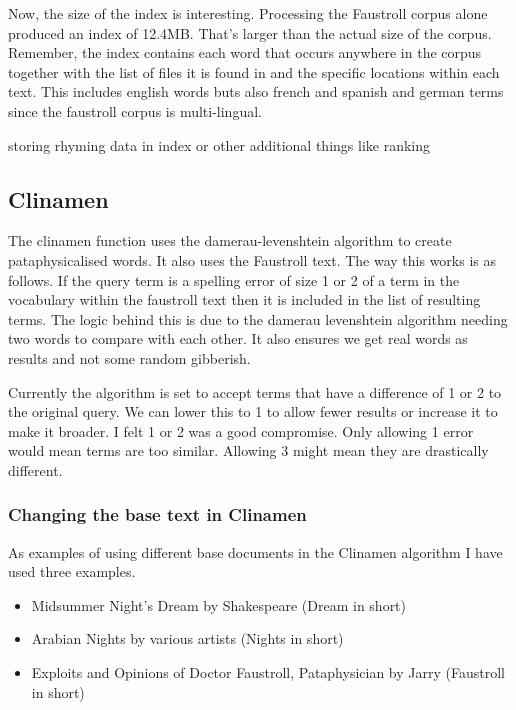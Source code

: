 {Now, the size of the index is interesting. Processing the Faustroll corpus alone produced an index of 12.4MB. That's larger than the actual size of the corpus. Remember, the index contains each word that occurs anywhere in the corpus together with the list of files it is found in and the specific locations within each text. This includes english words buts also french and spanish and german terms since the faustroll corpus is multi-lingual.


storing rhyming data in index or other additional things like ranking


\subsection{Clinamen}

The clinamen function uses the damerau-levenshtein algorithm to create pataphysicalised words. It also uses the Faustroll text. The way this works is as follows. If the query term is a spelling error of size 1 or 2 of a term in the vocabulary within the faustroll text then it is included in the list of resulting terms. The logic behind this is due to the damerau levenshtein algorithm needing two words to compare with each other. It also ensures we get real words as results and not some random gibberish.

Currently the algorithm is set to accept terms that have a difference of 1 or 2 to the original query. We can lower this to 1 to allow fewer results or increase it to make it broader. I felt 1 or 2 was a good compromise. Only allowing 1 error would mean terms are too similar. Allowing 3 might mean they are drastically different.



\subsubsection{Changing the base text in Clinamen}
\label{s:basetext}

As examples of using different base documents in the Clinamen algorithm I have used three examples. 

\begin{itemize}
  \item Midsummer Night's Dream by Shakespeare (Dream in short)
  \item Arabian Nights by various artists (Nights in short)
  \item Exploits and Opinions of Doctor Faustroll, Pataphysician by Jarry (Faustroll in short)
\end{itemize}

}
